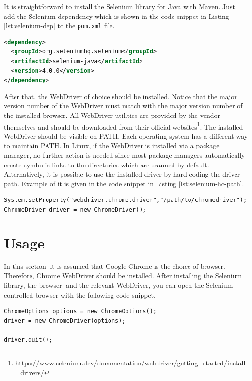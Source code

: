It is straightforward to install the Selenium library for Java with Maven. Just add the Selenium dependency which is shown in the code snippet in Listing \ref{lst:selenium-dep} to the \lstinline[language={}]!pom.xml! file.

\begin{lstlisting}[language=XML,caption={The Selenium dependency for Maven.},label=lst:selenium-dep]
<dependency>
  <groupId>org.seleniumhq.selenium</groupId>
  <artifactId>selenium-java</artifactId>
  <version>4.0.0</version>
</dependency>
\end{lstlisting}

After that, the WebDriver of choice should be installed. Notice that the major version number of the WebDriver must match with the major version number of the installed browser. All WebDriver utilities are provided by the vendor themselves and should be downloaded from their official websites\footnote{\url{https://www.selenium.dev/documentation/webdriver/getting\_started/install\_drivers/}}. The installed WebDriver should be visible on PATH. Each operating system has a different way to maintain PATH. In Linux, if the WebDriver is installed via a package manager, no further action is needed since most package managers automatically create symbolic links to the directories which are scanned by default. Alternatively, it is possible to use the installed driver by hard-coding the driver path. Example of it is given in the code snippet in Listing \ref{lst:selenium-hc-path}.

\begin{lstlisting}[caption={Using the driver from a hard-coded path.},label=lst:selenium-hc-path]
System.setProperty("webdriver.chrome.driver","/path/to/chromedriver");
ChromeDriver driver = new ChromeDriver();
\end{lstlisting}

\section{Usage}
In this section, it is assumed that Google Chrome is the choice of browser. Therefore, Chrome WebDriver should be installed. After installing the Selenium library, the browser, and the relevant WebDriver, you can open the Selenium-controlled browser with the following code snippet.

\begin{lstlisting}[caption={Start a Selenium-controlled browser instance.}]
ChromeOptions options = new ChromeOptions();
driver = new ChromeDriver(options);

driver.quit();
\end{lstlisting}

